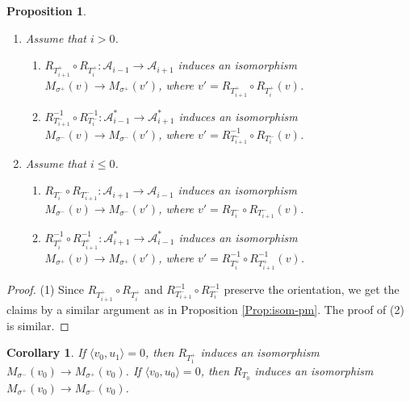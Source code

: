 \documentclass[leqno,11pt]{amsart}
\newtheorem{Prop}[Thm]{Proposition}
\newtheorem{Cor}[Thm]{Corollary}
\theoremstyle{definition}
\def\AA{\ensuremath{\mathcal A}}
\begin{document}
\begin{Prop}\label{Prop:isom-2}
\begin{enumerate}
\item[(1)]
Assume that $i>0$.
\begin{enumerate}
\item
$R_{T_{i+1}^+} \circ R_{T_i^+}:\AA_{i-1} \to \AA_{i+1}$
induces an isomorphism
$M_{\sigma^+}(v) \to M_{\sigma^+}(v')$, where 
$v'=R_{T_{i+1}^+} \circ R_{T_i^+}(v)$.
\item
$R_{T_{i+1}^-}^{-1} \circ R_{T_i^-}^{-1}:\AA_{i-1}^* \to \AA_{i+1}^*$
induces an isomorphism
$M_{\sigma^-}(v) \to M_{\sigma^-}(v')$, where
$v'=R_{T_{i+1}^-}^{-1} \circ R_{T_i^-}(v)$.
\end{enumerate}
\item[(2)]
Assume that $i \leq 0$.
\begin{enumerate}
\item
$R_{T_{i}^-} \circ R_{T_{i+1}^-}:\AA_{i+1} \to \AA_{i-1}$
induces an isomorphism
$M_{\sigma^-}(v) \to M_{\sigma^-}(v')$, where
$v'=R_{T_{i}^-} \circ R_{T_{i+1}^-}(v)$.
\item
$R_{T_{i}^+}^{-1} \circ R_{T_{i+1}^+}^{-1}:\AA_{i+1}^* \to \AA_{i-1}^*$
induces an isomorphism
$M_{\sigma^+}(v) \to M_{\sigma^+}(v')$, where
$v'=R_{T_{i}^+}^{-1} \circ R_{T_{i+1}^+}^{-1}(v)$.
\end{enumerate}
\end{enumerate}
\end{Prop}

\begin{proof}
(1)
Since $R_{T_{i+1}^+} \circ R_{T_i^+}$ and $R_{T_{i+1}^-}^{-1} \circ R_{T_i^-}^{-1}$
preserve the orientation,
we get the claims by a similar argument as in Proposition \ref{Prop:isom-pm}.  
The proof of (2) is similar.
\end{proof}






\begin{Cor}
If $\langle v_0,u_1 \rangle=0$,
then $R_{T_1^+}$ induces an isomorphism
$M_{\sigma^-}(v_0) \to M_{\sigma^+}(v_0)$. 
If $\langle v_0,u_0 \rangle=0$,
then $R_{T_0}$ induces an isomorphism
$M_{\sigma^+}(v_0) \to M_{\sigma^-}(v_0)$. 
\end{Cor}
\end{document}

